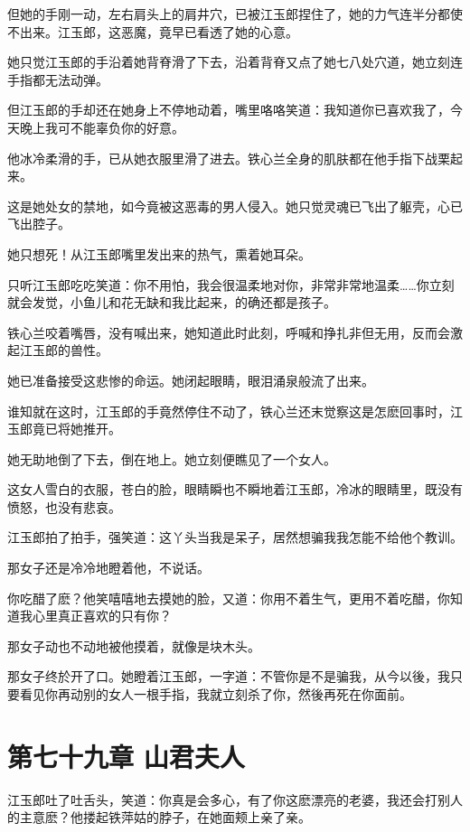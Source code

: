 \documentclass[12pt,oneside]{book}
\begin{document}
但她的手刚一动，左右肩头上的肩井穴，已被江玉郎捏住了，她的力气连半分都使不出来。江玉郎，这恶魔，竟早已看透了她的心意。

她只觉江玉郎的手沿着她背脊滑了下去，沿着背脊又点了她七八处穴道，她立刻连手指都无法动弹。

但江玉郎的手却还在她身上不停地动着，嘴里咯咯笑道：我知道你已喜欢我了，今天晚上我可不能辜负你的好意。

他冰冷柔滑的手，已从她衣服里滑了进去。铁心兰全身的肌肤都在他手指下战栗起来。

这是她处女的禁地，如今竟被这恶毒的男人侵入。她只觉灵魂已飞出了躯壳，心已飞出腔子。

她只想死！从江玉郎嘴里发出来的热气，熏着她耳朵。

只听江玉郎吃吃笑道：你不用怕，我会很温柔地对你，非常非常地温柔\ldots\ldots 你立刻就会发觉，小鱼儿和花无缺和我比起来，的确还都是孩子。

铁心兰咬着嘴唇，没有喊出来，她知道此时此刻，呼喊和挣扎非但无用，反而会激起江玉郎的兽性。

她已准备接受这悲惨的命运。她闭起眼睛，眼泪涌泉般流了出来。

谁知就在这时，江玉郎的手竟然停住不动了，铁心兰还末觉察这是怎麽回事时，江玉郎竟已将她推开。

她无助地倒了下去，倒在地上。她立刻便瞧见了一个女人。

这女人雪白的衣服，苍白的脸，眼睛瞬也不瞬地着江玉郎，冷冰的眼睛里，既没有愤怒，也没有悲哀。

江玉郎拍了拍手，强笑道：这丫头当我是呆子，居然想骗我我怎能不给他个教训。

那女子还是冷冷地瞪着他，不说话。

你吃醋了麽？他笑嘻嘻地去摸她的脸，又道：你用不着生气，更用不着吃醋，你知道我心里真正喜欢的只有你？

那女子动也不动地被他摸着，就像是块木头。

那女子终於开了口。她瞪着江玉郎，一字道：不管你是不是骗我，从今以後，我只要看见你再动别的女人一根手指，我就立刻杀了你，然後再死在你面前。

\hypertarget{ux7b2cux4e03ux5341ux4e5dux7ae0-ux5c71ux541bux592bux4eba}{%
\chapter{第七十九章
山君夫人}\label{ux7b2cux4e03ux5341ux4e5dux7ae0-ux5c71ux541bux592bux4eba}}

江玉郎吐了吐舌头，笑道：你真是会多心，有了你这麽漂亮的老婆，我还会打别人的主意麽？他搂起铁萍姑的脖子，在她面颊上亲了亲。
\end{document}
